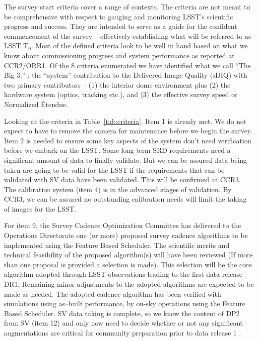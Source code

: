 The survey start criteria cover a range of contexts.  The criteria are not meant to be comprehensive with respect to gauging and monitoring LSST's scientific progress and success. They are intended to serve as a guide for the confident commencement of the survey -- effectively establishing what will be referred to as LSST T$_0$.  Most of the defined criteria look to be well in hand based on what we know about commissioning progress and system performance as reported at CCR2/ORR1.  Of the 8 criteria enumerated we have identified what we call ``The Big 3,'' : the ``system'' contribution to the Delivered Image Quality (sDIQ) with two primary contributors -- (1) the interior dome environment plus (2) the hardware system (optics, tracking etc.), and (3) the effective survey speed or Normalized \'{E}tendue. 

Looking at the criteria in Table~\ref{tab:criteria}, Item 1 is already met. We do not expect to have to remove the camera for maintenance before we begin the survey. Item 2 is needed to ensure some key aspects of the system don't need verification before we embark on the LSST. Some long term SRD requirements need a significant amount of data to finally validate. But we can be assured data being taken are going to be valid for the LSST if the requirements that can be validated with SV data have been validated. This will be confirmed at CCR3. The calibration system (item 4)  is in the advanced stages of validation. By CCR3, we can be assured no outstanding calibration needs will limit the taking of images for the LSST. 

For item 9, the Survey Cadence Optimization Committee has delivered to the Operations Directorate one (or more) proposed survey cadence algorithms to be implemented using the Feature Based Scheduler.  The scientific merits and technical feasibility of the proposed algorithm(s) will have been reviewed (If more than one proposal is provided a selection is made).  This selection will be the core algorithm adopted through LSST observations leading to the first data release DR1.  Remaining minor adjustments to the adopted algorithms are expected to be made as needed.  The adopted cadence algorithm has been verified with simulations using as--built performance, by on-sky operations using the Feature Based Scheduler.  SV data taking is complete, so we know the content of DP2 from SV (item 12) and only now need to decide whether or not any significant augmentations are critical for community preparation prior to data release 1 \citep[DR1; see][]{RTN-011}. 

